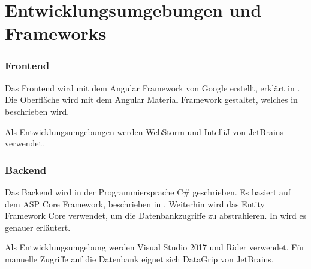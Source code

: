 
\newpage
\section{Entwicklungsumgebungen und Frameworks}

\subsubsection{Frontend}

Das Frontend wird mit dem Angular Framework von Google erstellt, erklärt in . Die Oberfläche wird mit dem Angular Material Framework gestaltet, welches in  beschrieben wird.

Als Entwicklungsumgebungen werden WebStorm und IntelliJ von JetBrains verwendet.

\subsubsection{Backend}

Das Backend wird in der Programmiersprache C\# geschrieben. Es basiert auf dem ASP Core Framework, beschrieben in . Weiterhin wird das Entity Framework Core verwendet, um die Datenbankzugriffe zu abstrahieren. In  wird es genauer erläutert.

Als Entwicklungsumgebung werden Visual Studio 2017 und Rider verwendet. Für manuelle Zugriffe auf die Datenbank eignet sich DataGrip von JetBrains.

